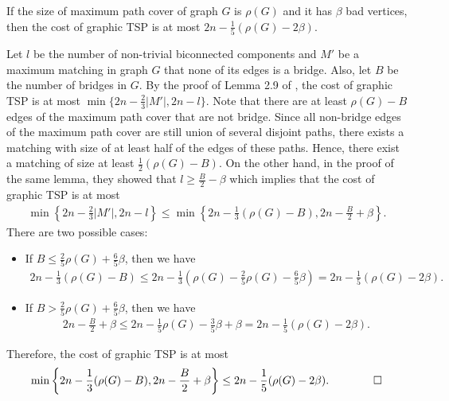 \begin{lemma}\label{lem:bound-path-cover-bad-vertices-tsp}
If the size of maximum path cover of graph $G$ is $\rho(G)$ and it has $\beta$ bad vertices, then the cost of graphic TSP is at most $2n - \frac{1}{5}(\rho(G) - 2\beta)$.
\end{lemma}
\begin{myproof}
Let $l$ be the number of non-trivial biconnected components and $M'$ be a maximum matching in graph $G$ that none of its edges is a bridge. Also, let $B$ be the number of bridges in $G$. By the proof of Lemma 2.9 of \cite{chen2020}, the cost of graphic TSP is at most $\min\{2n - \frac{2}{3}|M'|, 2n - l\}$. Note that there are at least $\rho(G) - B$ edges of the maximum path cover that are not bridge. Since all non-bridge edges of the maximum path cover are still union of several disjoint paths, there exists a matching with size of at least half of the edges of these paths. Hence, there exist a matching of size at least $\frac{1}{2}(\rho(G) - B)$. On the other hand, in the proof of the same lemma, they showed that $l \geq \frac{B}{2} - \beta$ which implies that the cost of graphic TSP is at most
\begin{align*}
\min\left\{2n - \frac{2}{3}|M'|, 2n - l\right\} \leq \min\left\{2n - \frac{1}{3}(\rho(G) - B), 2n - \frac{B}{2} + \beta\right\}.
\end{align*}
There are two possible cases:
\begin{itemize}
    \item If $B \leq \frac{2}{5}\rho(G) + \frac{6}{5}\beta$, then we have 
    \begin{align*}
        2n - \frac{1}{3}(\rho(G) - B) \leq 2n - \frac{1}{3}(\rho(G) - \frac{2}{5}\rho(G) - \frac{6}{5}\beta) = 2n - \frac{1}{5}(\rho(G) - 2\beta).
    \end{align*}
    \item If $B > \frac{2}{5}\rho(G) + \frac{6}{5}\beta$, then we have
    \begin{align*}
        2n - \frac{B}{2} + \beta \leq 2n - \frac{1}{5}\rho(G) - \frac{3}{5}\beta + \beta = 2n - \frac{1}{5}(\rho(G) - 2\beta).
    \end{align*}
\end{itemize}
Therefore, the cost of graphic TSP is at most
\begin{align*}
    \min\left\{2n - \frac{1}{3}(\rho(G) - B), 2n - \frac{B}{2} + \beta\right\} \leq 2n - \frac{1}{5}(\rho(G) - 2\beta). \qquad \qedhere
\end{align*}
\end{myproof}

